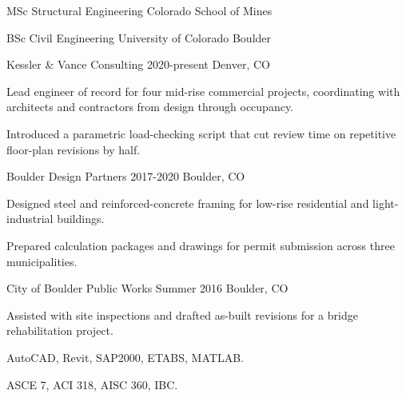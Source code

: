 \documentclass{LoLaTeXcv}
\begin{document}


\begin{lltxDescription}
	\item[2015-2017] MSc Structural Engineering \lltxdotfill Colorado School of Mines
	\item[2011-2015] BSc Civil Engineering \lltxdotfill University of Colorado Boulder
\end{lltxDescription}

\begin{lltxJob}{
		Kessler \& Vance Consulting}{
		2020-present}{
		Denver, CO}
	\item Lead engineer of record for four mid-rise commercial projects, coordinating with architects and contractors from design through occupancy.
	\item Introduced a parametric load-checking script that cut review time on repetitive floor-plan revisions by half.
\end{lltxJob}

\begin{lltxJob}{
		Boulder Design Partners}{
		2017-2020}{
		Boulder, CO}
	\item Designed steel and reinforced-concrete framing for low-rise residential and light-industrial buildings.
	\item Prepared calculation packages and drawings for permit submission across three municipalities.
\end{lltxJob}

\begin{lltxJob}{
		City of Boulder Public Works}{
		Summer 2016}{
		Boulder, CO}
	\item Assisted with site inspections and drafted as-built revisions for a bridge rehabilitation project.
\end{lltxJob}


\begin{lltxDescription}
	\item[Software] AutoCAD, Revit, SAP2000, ETABS, MATLAB.
	\item[Standards] ASCE 7, ACI 318, AISC 360, IBC.
\end{lltxDescription}
\end{document}
